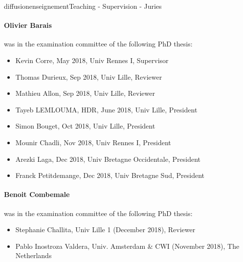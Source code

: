 \documentclass{ra2018}
\begin{document}
\begin{module}{diffusion}{enseignement}{Teaching - Supervision - Juries}
\paragraph*{Olivier Barais} was in the examination committee of the following PhD thesis: 
\begin{itemize}
	\item Kevin Corre, May 2018, Univ Rennes I, Supervisor
	\item Thomas Durieux, Sep 2018, Univ Lille, Reviewer
	\item Mathieu Allon, Sep 2018, Univ Lille, Reviewer
	\item Tayeb LEMLOUMA, HDR, June 2018, Univ Lille, President
	\item Simon Bouget, Oct 2018, Univ Lille, President
	\item Mounir Chadli, Nov 2018, Univ Rennes I, President
	\item Arezki Laga, Dec 2018, Univ Bretagne Occidentale, President
	\item Franck Petitdemange, Dec 2018, Univ Bretagne Sud, President	
\end{itemize}

\paragraph*{Benoit Combemale} was in the examination committee of the following PhD thesis: 
\begin{itemize}
	\item Stephanie Challita, Univ Lille 1 (December 2018), Reviewer
	\item Pablo Inostroza Valdera, Univ. Amsterdam \& CWI (November 2018), The Netherlands
\end{itemize}

\end{module}
\end{document}
